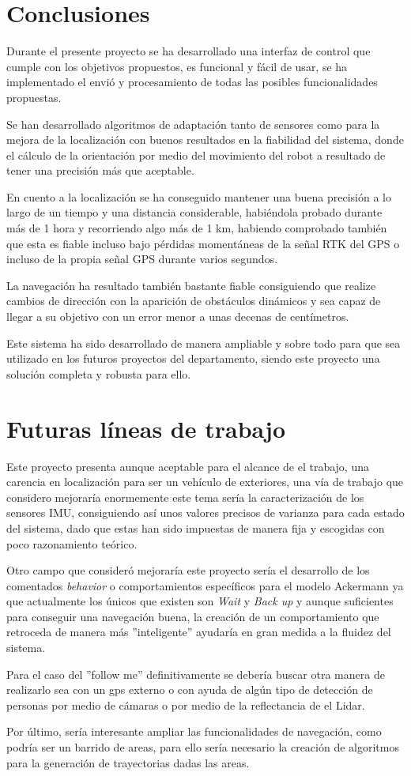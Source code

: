 \chapter{Conclusiones}
Durante el presente proyecto se ha desarrollado una interfaz de control que cumple con los objetivos propuestos, es funcional y fácil de usar, 
se ha implementado el envió y procesamiento de todas las posibles funcionalidades propuestas.

Se han desarrollado algoritmos de adaptación tanto de sensores como para la mejora de la localización con buenos resultados en la fiabilidad del sistema, donde el cálculo 
de la orientación por medio del movimiento del robot a resultado de tener una precisión más que aceptable.

En cuento a la localización se ha conseguido mantener una buena precisión a lo largo de un tiempo y una distancia considerable, habiéndola probado durante más de 1 hora 
y recorriendo algo más de 1 km, habiendo comprobado también
que esta es fiable incluso bajo pérdidas momentáneas de la señal RTK del GPS o incluso de la propia señal GPS durante varios segundos.

La navegación ha resultado también bastante fiable consiguiendo que realize cambios de dirección con la aparición de obstáculos dinámicos y sea capaz de 
llegar a su objetivo con un error menor a unas decenas de centímetros.

Este sistema ha sido desarrollado de manera ampliable y sobre todo para que sea utilizado en los futuros proyectos del departamento, 
siendo este proyecto una solución completa y robusta para ello.

\chapter{Futuras líneas de trabajo}

Este proyecto presenta aunque aceptable para el alcance de el trabajo, una carencia en localización para ser un vehículo de exteriores, 
una vía de trabajo que considero mejoraría enormemente este tema sería la caracterización de los sensores IMU, consiguiendo así unos 
valores precisos de varianza para cada estado del sistema, dado que estas han sido impuestas de manera fija y escogidas con poco 
razonamiento teórico.

Otro campo que consideró mejoraría este proyecto sería el desarrollo de los comentados \textit{behavior} o comportamientos específicos para 
el modelo Ackermann ya que actualmente los únicos que existen son \textit{Wait} y \textit{Back up} y aunque suficientes para conseguir una navegación buena,
la creación de un comportamiento que retroceda de manera más ''inteligente'' ayudaría en gran medida a la fluidez del sistema.

Para el caso del ''follow me'' definitivamente se debería buscar otra manera de realizarlo sea con un gps externo o con ayuda de algún tipo de 
detección de personas por medio de cámaras o por medio de la reflectancia de el Lidar.

Por último, sería interesante ampliar las funcionalidades de navegación, como podría ser un barrido de areas, para ello sería necesario 
la creación de algoritmos para la generación de trayectorias dadas las areas.